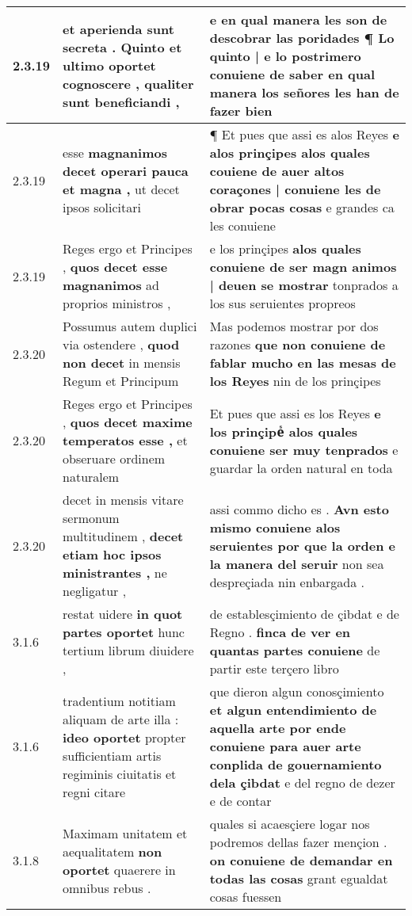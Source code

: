 \begin{tabular}{|p{1cm}|p{6.5cm}|p{6.5cm}|}
2.3.19 & et aperienda sunt secreta . \textbf{ Quinto et ultimo oportet cognoscere , } qualiter sunt beneficiandi , & e en qual manera les son de descobrar las poridades ¶ \textbf{ Lo quinto | e lo postrimero conuiene de saber } en qual manera los señores les han de fazer bien \\\hline
2.3.19 & esse \textbf{ magnanimos decet operari pauca et magna , } ut decet ipsos solicitari & ¶ Et pues que assi es alos Reyes \textbf{ e alos prinçipes alos quales couiene de auer altos coraçones | conuiene les de obrar pocas cosas } e grandes ca les conuiene \\\hline
2.3.19 & Reges ergo et Principes , \textbf{ quos decet esse magnanimos } ad proprios ministros , & e los prinçipes \textbf{ alos quales conuiene de ser magn animos | deuen se mostrar } tonprados a los sus seruientes propreos \\\hline
2.3.20 & Possumus autem duplici via ostendere , \textbf{ quod non decet } in mensis Regum et Principum & Mas podemos mostrar por dos razones \textbf{ que non conuiene de fablar mucho en las mesas de los Reyes } nin de los prinçipes \\\hline
2.3.20 & Reges ergo et Principes , \textbf{ quos decet maxime temperatos esse , } et obseruare ordinem naturalem & Et pues que assi es los Reyes \textbf{ e los prinçipeᷤ alos quales conuiene ser muy tenprados } e guardar la orden natural en toda \\\hline
2.3.20 & decet in mensis vitare sermonum multitudinem , \textbf{ decet etiam hoc ipsos ministrantes , } ne negligatur , & assi commo dicho es . \textbf{ Avn esto mismo conuiene alos seruientes por que la orden e la manera del seruir } non sea despreçiada nin enbargada . \\\hline
3.1.6 & restat uidere \textbf{ in quot partes oportet } hunc tertium librum diuidere , & de establesçimiento de çibdat e de Regno . \textbf{ finca de ver en quantas partes conuiene } de partir este terçero libro \\\hline
3.1.6 & tradentium notitiam aliquam de arte illa : \textbf{ ideo oportet } propter sufficientiam artis regiminis ciuitatis et regni citare & que dieron algun conosçimiento \textbf{ et algun entendimiento de aquella arte por ende conuiene para auer arte conplida de gouernamiento dela çibdat } e del regno de dezer e de contar \\\hline
3.1.8 & Maximam unitatem et aequalitatem \textbf{ non oportet } quaerere in omnibus rebus . & quales si acaesçiere logar nos podremos dellas fazer mençion . \textbf{ on conuiene de demandar en todas las cosas } grant egualdat cosas fuessen \\\hline

\end{tabular}
